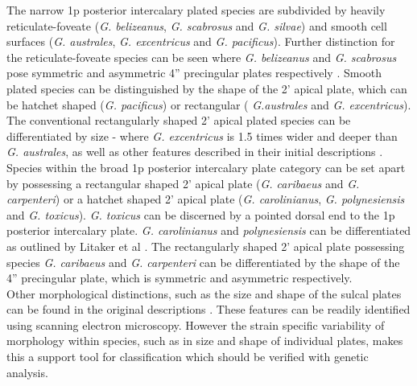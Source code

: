 \documentclass[12pt]{article}
\begin{document}
The narrow 1p posterior intercalary plated species are subdivided by heavily reticulate-foveate (\emph{G. belizeanus}, \emph{G. scabrosus} and \emph{G. silvae}) and smooth cell surfaces (\emph{G. australes}, \emph{G. excentricus} and \emph{G. pacificus}). Further distinction for the reticulate-foveate species can be seen where \emph{G. belizeanus} and \emph{G. scabrosus} pose symmetric and asymmetric 4'' precingular plates respectively \cite{nishimura2014morphology}. %
Smooth plated species can be distinguished by the shape of the 2' apical plate, which can be hatchet shaped (\emph{G. pacificus}) or rectangular ( \emph{G.australes} and \emph{G. excentricus}). The conventional rectangularly shaped 2' apical plated species can be differentiated by size - where \emph{G. excentricus} is 1.5 times wider and deeper than \emph{G. australes}, as well as other features described in their initial descriptions \cite{chinain1999morphology,fraga2011gambierdiscus}. \\

Species within the broad 1p posterior intercalary plate category can be set apart by possessing a rectangular shaped 2' apical plate (\emph{G. caribaeus} and \emph{G. carpenteri}) or a hatchet shaped 2' apical plate (\emph{G. carolinianus}, \emph{G. polynesiensis} and \emph{G. toxicus}).
\emph{G. toxicus} can be discerned by a pointed dorsal end to the 1p posterior intercalary plate. \emph{G. carolinianus} and \emph{polynesiensis} can be differentiated as outlined by Litaker et al \cite{litaker2009taxonomy}. The rectangularly shaped 2' apical plate possessing species \emph{G. caribaeus} and \emph{G. carpenteri} can be differentiated by the shape of the 4'' precingular plate, which is symmetric and asymmetric respectively. \\

Other morphological distinctions, such as the size and shape of the sulcal plates can be found in the original descriptions  \cite{litaker2009taxonomy,fraga2011gambierdiscus,faust1995observation,holmes1998gambierdiscus,chinain1999morphology}. %
These features can be readily identified using scanning electron microscopy. However the strain specific variability of morphology within species, such as in size and shape of individual plates, makes this a support tool for classification which should be verified with genetic analysis. \\
\end{document}
